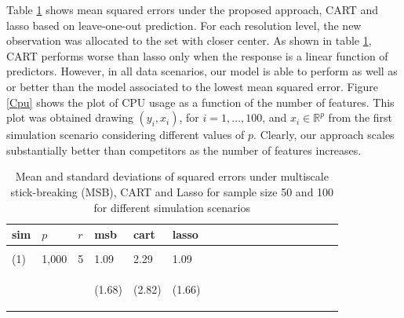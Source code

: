 \documentclass{article}
\newcommand{\Real}{\mathbb{R}}
\begin{document}
Table \ref{table1} shows mean squared errors under the proposed approach, CART and lasso based on leave-one-out prediction. For each resolution level, the new observation was allocated to the set with closer center. As shown in table \ref{table1}, CART performs worse than lasso only when the response is a linear function of predictors. However, in all data scenarios, our model is able to perform as well as or better than the model associated to the lowest mean squared error.  Figure \ref{Cpu} shows the plot of CPU usage as a function of the number of features. This plot was obtained drawing $(y_i, x_i)$, for $i=1, \ldots, 100$, and $x_i \in \Real^p$  from the first simulation scenario considering different values of $p$. Clearly, our approach scales substantially better than competitors as the number of features increases.
\begin{table}[t]
\caption{Mean and standard deviations of squared errors under multiscale stick-breaking (MSB), CART and Lasso for sample size 50 and 100 for different simulation scenarios}
\label{table1} \vskip 0.15in \begin{center} \begin{small} \begin{sc}
\begin{tabular}{llllllllllllllllll}
\hline
\abovespace\belowspace
 sim&$p$&$r$& msb&cart&lasso\\
\hline
\\
(1)&1,000&5&     1.09 & 2.29 & 1.09\\
&& & \begin{scriptsize} (1.68)\end{scriptsize} & \begin{scriptsize} (2.82)\end{scriptsize}& \begin{scriptsize} (1.66)\end{scriptsize}\\


\end{tabular}
\end{sc}
\end{small}
\end{center}
\end{table}
\end{document}
